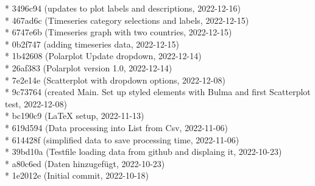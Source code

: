 \documentclass[usegeometry=true]{scrartcl}
\begin{document}
* 3496c94 (updates to plot labels and descriptions, 2022-12-16)\\
* 467ad6c (Timeseries category selections and labels, 2022-12-15)\\
* 6747e6b (Timeseries graph with two countries, 2022-12-15)\\
* 0b2f747 (adding timeseries data, 2022-12-15)\\
* 1b42608 (Polarplot Update dropdown, 2022-12-14)\\
* 26af383 (Polarplot version 1.0, 2022-12-14)\\
* 7e2e14e (Scatterplot with dropdown options, 2022-12-08)\\
* 9c73764 (created Main. Set up styled elements with Bulma and first Scatterplot test, 2022-12-08)\\
* bc190c9 (LaTeX setup, 2022-11-13)\\
* 619d594 (Data processing into List from Csv, 2022-11-06)\\
* 614428f (simplified data to save processing time, 2022-11-06)\\
* 39bd10a (Testfile loading data from github and displaing it, 2022-10-23)\\
* a80c6ed (Daten hinzugefügt, 2022-10-23)\\
* 1e2012e (Initial commit, 2022-10-18)\\
\end{document}

